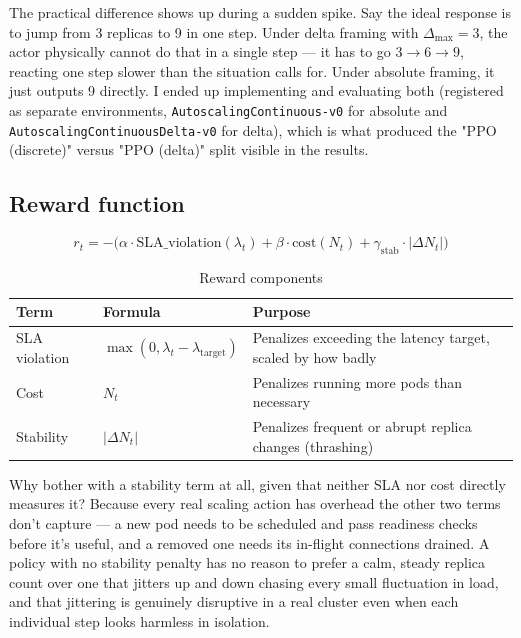 \documentclass{rapportINPTCLOUD}
\begin{document}
The practical difference shows up during a sudden spike. Say the ideal response is to jump from 3 replicas to 9 in one step. Under delta framing with $\Delta_{\max}=3$, the actor physically cannot do that in a single step — it has to go $3 \to 6 \to 9$, reacting one step slower than the situation calls for. Under absolute framing, it just outputs 9 directly. I ended up implementing and evaluating both (registered as separate environments, \texttt{AutoscalingContinuous-v0} for absolute and \texttt{AutoscalingContinuousDelta-v0} for delta), which is what produced the "PPO (discrete)" versus "PPO (delta)" split visible in the results.

\subsection{Reward function}
\label{sec:reward}

\begin{equation}
r_t = -\Big(\alpha \cdot \text{SLA\_violation}(\lambda_t) + \beta \cdot \text{cost}(N_t) + \gamma_{\text{stab}} \cdot |\Delta N_t|\Big)
\end{equation}

\begin{table}[h]
\centering
\begin{tabularx}{\textwidth}{lXX}
\toprule
\textbf{Term} & \textbf{Formula} & \textbf{Purpose} \\
\midrule
SLA violation & $\max(0, \lambda_t - \lambda_{\text{target}})$ & Penalizes exceeding the latency target, scaled by how badly \\
Cost & $N_t$ & Penalizes running more pods than necessary \\
Stability & $|\Delta N_t|$ & Penalizes frequent or abrupt replica changes (thrashing) \\
\bottomrule
\end{tabularx}
\caption{Reward components}
\end{table}

Why bother with a stability term at all, given that neither SLA nor cost directly measures it? Because every real scaling action has overhead the other two terms don't capture — a new pod needs to be scheduled and pass readiness checks before it's useful, and a removed one needs its in-flight connections drained. A policy with no stability penalty has no reason to prefer a calm, steady replica count over one that jitters up and down chasing every small fluctuation in load, and that jittering is genuinely disruptive in a real cluster even when each individual step looks harmless in isolation.
\end{document}
